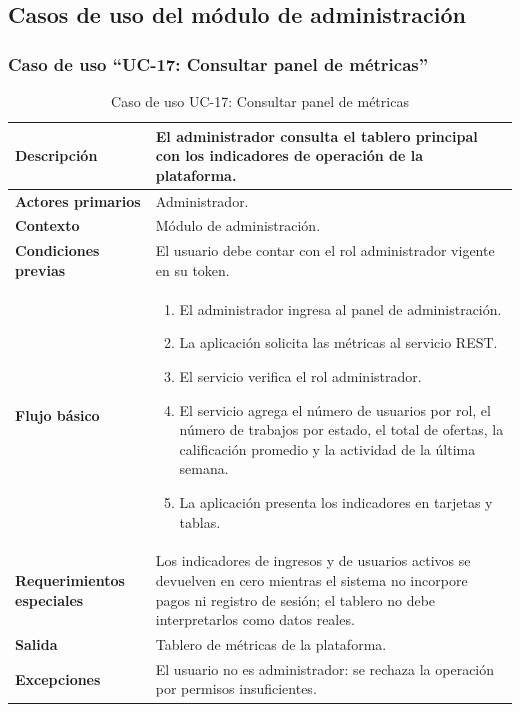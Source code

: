 \documentclass[doc,12pt,a4paper]{apa7}
\begin{document}
\subsection{Casos de uso del módulo de administración}

\subsubsection{Caso de uso ``UC-17: Consultar panel de métricas''}

\begin{longtable}{|P{3.3cm}|L{11.2cm}|}
\caption{Caso de uso UC-17: Consultar panel de métricas}\\
\hline
\textbf{Descripción} & El administrador consulta el tablero principal con los indicadores de operación de la plataforma. \\ \hline
\textbf{Actores primarios} & Administrador. \\ \hline
\textbf{Contexto} & Módulo de administración. \\ \hline
\textbf{Condiciones previas} & El usuario debe contar con el rol administrador vigente en su token. \\ \hline
\textbf{Flujo básico} &
\begin{enumerate}
    \item El administrador ingresa al panel de administración.
    \item La aplicación solicita las métricas al servicio REST.
    \item El servicio verifica el rol administrador.
    \item El servicio agrega el número de usuarios por rol, el número de trabajos por estado, el total de ofertas, la calificación promedio y la actividad de la última semana.
    \item La aplicación presenta los indicadores en tarjetas y tablas.
\end{enumerate} \\ \hline
\textbf{Requerimientos especiales} & Los indicadores de ingresos y de usuarios activos se devuelven en cero mientras el sistema no incorpore pagos ni registro de sesión; el tablero no debe interpretarlos como datos reales. \\ \hline
\textbf{Salida} & Tablero de métricas de la plataforma. \\ \hline
\textbf{Excepciones} & El usuario no es administrador: se rechaza la operación por permisos insuficientes. \\ \hline
\end{longtable}
\end{document}

